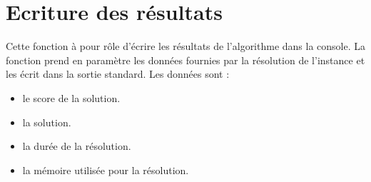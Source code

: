 \section{Ecriture des résultats}
Cette fonction à pour rôle d'écrire les résultats de l'algorithme dans la console.
La fonction prend en paramètre les données fournies par la résolution de l'instance et les écrit dans la sortie standard.
Les données sont :
\begin{itemize}
    \item le score de la solution.
    \item la solution.
    \item la durée de la résolution.
    \item la mémoire utilisée pour la résolution.
\end{itemize}
